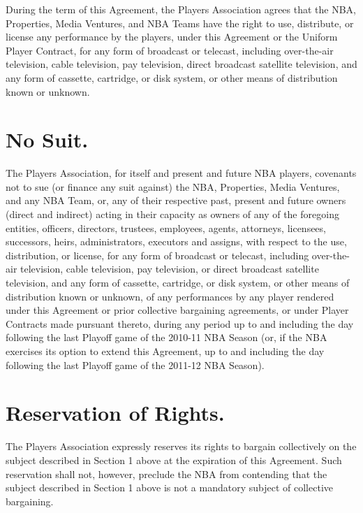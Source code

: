 \documentclass[
]{book}
\begin{document}
During the term of this Agreement, the Players Association agrees that the NBA, Properties, Media Ventures, and NBA Teams have the right to use, distribute, or license any performance by the players, under this Agreement or the Uniform Player Contract, for any form of broadcast or telecast, including over-the-air television, cable television, pay television, direct broadcast satellite television, and any form of cassette, cartridge, or disk system, or other means of distribution known or unknown.

\hypertarget{no-suit.}{%
\section{No Suit.}\label{no-suit.}}

The Players Association, for itself and present and future NBA players, covenants not to sue (or finance any suit against) the NBA, Properties, Media Ventures, and any NBA Team, or, any of their respective past, present and future owners (direct and indirect) acting in their capacity as owners of any of the foregoing entities, officers, directors, trustees, employees, agents, attorneys, licensees, successors, heirs, administrators, executors and assigns, with respect to the use, distribution, or license, for any form of broadcast or telecast, including over-the-air television, cable television, pay television, or direct broadcast satellite television, and any form of cassette, cartridge, or disk system, or other means of distribution known or unknown, of any performances by any player rendered under this Agreement or prior collective bargaining agreements, or under Player Contracts made pursuant thereto, during any period up to and including the day following the last Playoff game of the 2010-11 NBA Season (or, if the NBA exercises its option to extend this Agreement, up to and including the day following the last Playoff game of the 2011-12 NBA Season).

\hypertarget{reservation-of-rights.}{%
\section{Reservation of Rights.}\label{reservation-of-rights.}}

The Players Association expressly reserves its rights to bargain collectively on the subject described in Section 1 above at the expiration of this Agreement. Such reservation shall not, however, preclude the NBA from contending that the subject described in Section 1 above is not a mandatory subject of collective bargaining.
\end{document}
